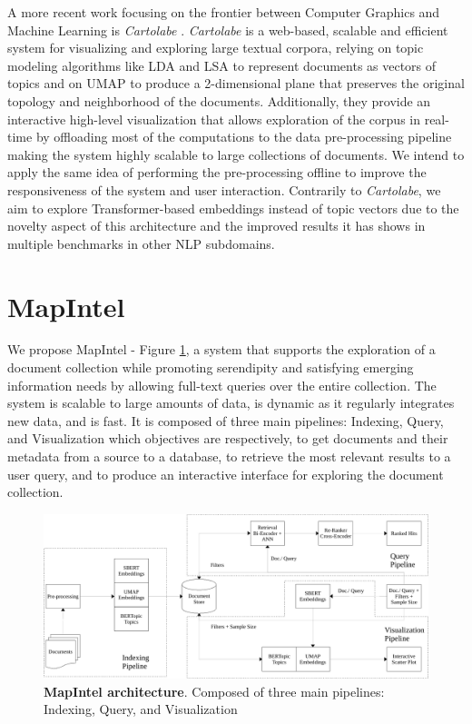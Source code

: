 \documentclass[a4paper]{article}
\begin{document}
A more recent work focusing on the frontier between Computer Graphics and Machine Learning is \emph{Cartolabe} \citet{caillou2021}. \emph{Cartolabe} is a web-based, scalable and efficient system for visualizing and exploring large textual corpora, relying on topic modeling algorithms like LDA \citep{blei2003} and LSA \citep{deerwester1990} to represent documents as vectors of topics and on UMAP \citep{mcinnes2020} to produce a 2-dimensional plane that preserves the original topology and neighborhood of the documents. Additionally, they provide an interactive high-level visualization that allows exploration of the corpus in real-time by offloading most of the computations to the data pre-processing pipeline making the system highly scalable to large collections of documents. We intend to apply the same idea of performing the pre-processing offline to improve the responsiveness of the system and user interaction. Contrarily to \emph{Cartolabe}, we aim to explore Transformer-based embeddings instead of topic vectors due to the novelty aspect of this architecture and the improved results it has shows in multiple benchmarks in other NLP subdomains.

\section{MapIntel}
We propose MapIntel - Figure \ref{system_architecture}, a system that supports the exploration of a document collection while promoting serendipity and satisfying emerging information needs by allowing full-text queries over the entire collection.
The system is scalable to large amounts of data, is dynamic as it regularly integrates new data, and is fast. It is composed of three main pipelines: Indexing, Query, and Visualization which objectives are respectively, to get documents and their metadata from a source to a database, to retrieve the most relevant results to a user query, and to produce an interactive interface for exploring the document collection. 

\begin{figure}[H]
  \centering
  \includegraphics[scale=0.5]{./assets/system_architecture}
  \caption{\textbf{MapIntel architecture}. Composed of three main pipelines: Indexing, Query, and Visualization}
  \label{system_architecture}
\end{figure}
\end{document}
